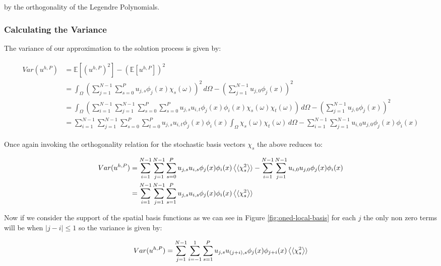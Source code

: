 by the orthogonality of the Legendre Polynomials.

\subsubsection{Calculating the Variance}

The variance of our approximation to the solution process is given by:

\begin{align}
  \begin{split}
    Var(u^{h,P}) &= \mathbb{E}\left[\left(u^{h,P}\right)^2\right]
                    - \left(\mathbb{E}\left[u^{h,P}\right]\right)^2 \\
      &= \int_\Omega\left(\sum_{j=1}^{N - 1}\sum_{s=0}^Pu_{j,s}\phi_j(x)\chi_s(\omega)\right)^2\, d\Omega
        - \left(\sum_{j=1}^{N - 1}u_{j,0}\phi_j(x)\right)^2 \\
      &= \int_\Omega\left(\sum_{i=1}^{N - 1}\sum_{j=1}^{N - 1}\sum_{s=0}^P\sum_{s=0}^P
           u_{j,s}u_{i,t}\phi_j(x)\phi_i(x)\chi_s(\omega)\chi_t(\omega)
         \right)\, d\Omega - \left(\sum_{j=1}^{N - 1}u_{j,0}\phi_j(x)\right)^2 \\
      &= \sum_{i=1}^{N - 1}\sum_{j=1}^{N - 1}\sum_{s=0}^P\sum_{t=0}^Pu_{j,s}u_{i,t}
            \phi_j(x)\phi_i(x)\int_\Omega\chi_s(\omega)\chi_t(\omega)\, d\Omega
            - \sum_{i=1}^{N - 1}\sum_{j=1}^{N - 1}u_{i,0}u_{j,0}\phi_j(x)\phi_i(x)
  \end{split}
\end{align}

Once again invoking the orthogonality relation for the stochastic basis vectors
$\chi_s$ the above reduces to:

\begin{align}
  \begin{split}
    Var(u^{h,P}) &= \sum_{i=1}^{N - 1}\sum_{j=1}^{N - 1}\sum_{s=0}^P
      u_{j,s}u_{i,s}\phi_j(x)\phi_i(x)\left\langle\langle\chi_s^2\right\rangle\rangle
            - \sum_{i=1}^{N - 1}\sum_{j=1}^{N-1}u_{i,0}u_{j,0}\phi_j(x)\phi_i(x) \\
      &= \sum_{i=1}^{N-1}\sum_{j=1}^{N-1}\sum_{s=1}^P
            u_{j,s}u_{i,s}\phi_j(x)\phi_i(x)\left\langle\langle\chi_s^2\right\rangle\rangle
  \end{split}
\end{align}

Now if we consider the support of the spatial basis functions as we can see in
Figure \ref{fig:oned-local-basis} for each $j$ the only non zero terms will be
when $|j - i| \leq 1$ so the variance is given by:

\begin{equation}
    Var(u^{h,P})= \sum_{j=1}^{N-1}\sum_{i=-1}^1\sum_{s=1}^P
      u_{j,s}u_{(j+i),s}\phi_j(x)\phi_{j+i}(x)\left\langle\langle\chi_s^2\right\rangle\rangle
\end{equation}
